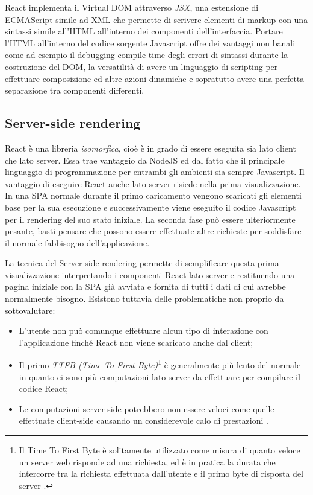 React implementa il Virtual DOM attraverso \textit{JSX}, una estensione di ECMAScript simile ad XML che permette di scrivere elementi di markup con una sintassi simile all'HTML all'interno dei componenti dell'interfaccia. Portare l'HTML all'interno del codice sorgente Javascript offre dei vantaggi non banali come ad esempio il debugging compile-time degli errori di sintassi durante la costruzione del DOM, la versatilità di avere un linguaggio di scripting per effettuare composizione ed altre azioni dinamiche e sopratutto avere una perfetta separazione tra componenti differenti.

\subsection{Server-side rendering}
\label{ReactServerSideRendering}
React è una libreria \textit{isomorfica}, cioè è in grado di essere eseguita sia lato client che lato server. Essa trae vantaggio da NodeJS ed dal fatto che il principale linguaggio di programmazione per entrambi gli ambienti sia sempre Javascript.
Il vantaggio di eseguire React anche lato server risiede nella prima visualizzazione. In una SPA normale durante il primo caricamento vengono scaricati gli elementi base per la sua esecuzione e successivamente viene eseguito il codice Javascript per il rendering del suo stato iniziale. La seconda fase può essere ulteriormente pesante, basti pensare che possono essere effettuate altre richieste per soddisfare il normale fabbisogno dell'applicazione.

La tecnica del Server-side rendering permette di semplificare questa prima visualizzazione interpretando i componenti React lato server e restituendo una pagina iniziale con la SPA già avviata e fornita di tutti i dati di cui avrebbe normalmente bisogno. Esistono tuttavia delle problematiche non proprio da sottovalutare: 

\begin{itemize}
    \item L'utente non può comunque effettuare alcun tipo di interazione con l'applicazione finché React non viene scaricato anche dal client;
    \item Il primo \textit{TTFB (Time To First Byte)}\footnote{Il Time To First Byte è solitamente utilizzato come misura di quanto veloce un server web risponde ad una richiesta, ed è in pratica la durata che intercorre tra la richiesta effettuata dall'utente e il primo byte di risposta del server \cite{GrahamOnTTFB}.} è generalmente più lento del normale in quanto ci sono più computazioni lato server da effettuare per compilare il codice React;
    \item Le computazioni server-side potrebbero non essere veloci come quelle effettuate client-side causando un considerevole calo di prestazioni \cite{GrigoryanOnServerSideRendering}.
\end{itemize}